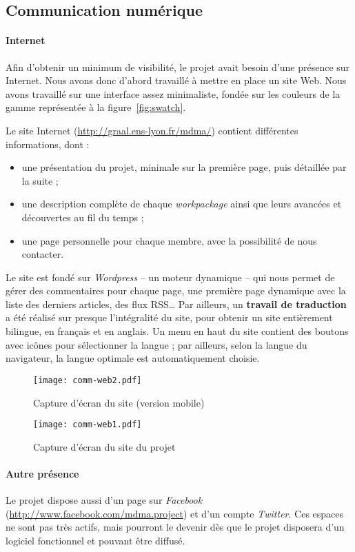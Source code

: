 \subsection{Communication numérique}
\paragraph{Internet}
\par Afin d'obtenir un minimum de visibilité, le projet avait besoin d'une présence sur Internet. Nous avons donc d'abord travaillé à mettre en place un site Web. Nous avons travaillé sur une interface assez minimaliste, fondée sur les couleurs de la gamme représentée à la figure~\ref{fig:swatch}.
\par Le site Internet (\url{http://graal.ens-lyon.fr/mdma/}) contient différentes informations, dont :
\begin{itemize}
  \item une présentation du projet, minimale sur la première page, puis détaillée par la suite ;
  \item une description complète de chaque \emph{workpackage} ainsi que leurs avancées et découvertes au fil du temps ;
  \item une page personnelle pour chaque membre, avec la possibilité de nous contacter.
\end{itemize}
\par Le site est fondé sur \emph{Wordpress} -- un moteur dynamique -- qui nous permet de gérer des commentaires pour chaque page, une première page dynamique avec la liste des derniers articles, des flux RSS… Par ailleurs, un \textbf{travail de traduction} a été réalisé sur presque l'intégralité du site, pour obtenir un site entièrement bilingue, en français et en anglais. Un menu en haut du site contient des boutons avec icônes pour sélectionner la langue ; par ailleurs, selon la langue du navigateur, la langue optimale est automatiquement choisie.
\begin{figure}[H]
  \centering
    \texttt{[image: comm-web2.pdf]}
  \caption{Capture d'écran du site (version mobile)}
\end{figure}
\begin{figure}[H]
  \centering
    \texttt{[image: comm-web1.pdf]}
  \caption{Capture d'écran du site du projet}
\end{figure}
\paragraph{Autre présence}
\par Le projet dispose aussi d'un page sur \emph{Facebook} (\url{http://www.facebook.com/mdma.project}) et d'un compte \emph{Twitter}. Ces espaces ne sont pas très actifs, mais pourront le devenir dès que le projet disposera d'un logiciel fonctionnel et pouvant être diffusé.
